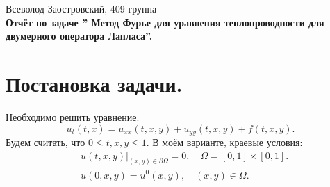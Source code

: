 \documentclass[14pt,a4paper]{extarticle}
\newcommand{\1}{\mathbbm{1}}
\begin{document}
\begin{center}
    {Всеволод Заостровский, 409 группа}\\
    {\bfseries Отчёт по задаче '' Метод Фурье для уравнения 
    теплопроводности для двумерного оператора Лапласа''.\\}
    \vspace{1cm}
\end{center}

\tableofcontents

\section{Постановка задачи.} \label{diffeq1}
Необходимо решить уравнение:
\begin{equation*} 
    u_t(t, x) = u_{xx}(t, x, y) + u_{yy}(t, x, y) + f(t, x, y).
\end{equation*}
Будем считать, что $0 \leq t,x,y \leq 1$. В моём варианте, краевые условия:
\begin{align*} 
    &u(t, x, y) \big| _{(x ,y) \in \partial \Omega} = 0, \quad \Omega = [0,1] \times [0,1]. \\
    &u(0, x, y) = u^0(x, y), \quad (x, y) \in \Omega. 
\end{align*}


\end{document}
